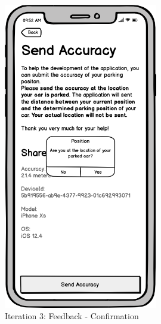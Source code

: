 \begin{figure}[H]
  \centering
  \begin{minipage}[b]{0.45\textwidth}
    \centering
    \includegraphics[width=0.6\textwidth]{images/UI/Iteration3-Feedback-Confirmation.png}
    \caption{Iteration 3: Feedback - Confirmation}
    \label{fig:i3-feedback-con}
  \end{minipage}
  \hfill
  \begin{minipage}[b]{0.45\textwidth}
    \centering

\end{minipage}
\end{figure}
